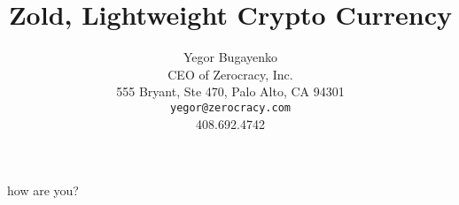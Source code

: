 \documentclass[11pt,oneside]{article}
\title{Zold, Lightweight Crypto Currency}
\author{Yegor Bugayenko\\
CEO of Zerocracy, Inc.\\
555 Bryant, Ste 470, Palo Alto, CA 94301\\
\texttt{yegor@zerocracy.com}\\
408.692.4742}
\begin{document}
\raggedbottom

how are you?
\end{document}

